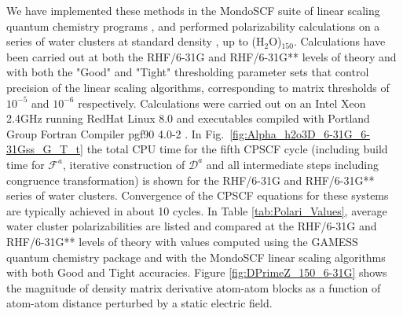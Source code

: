 \documentclass[prl,aps,twocolumn,showpacs,twocolumngrid,superbib]{revtex4}
\begin{document}
We have implemented these methods in the MondoSCF suite of linear scaling quantum chemistry programs \cite{},
and performed polarizability calculations on a series of water clusters at standard density \cite{Water}, 
up to (H$_2$O)$_{150}$. Calculations have been carried out at both the RHF/6-31G and RHF/6-31G** levels of 
theory and with both the "Good" and "Tight" thresholding parameter sets that control precision of the 
linear scaling algorithms, corresponding to matrix thresholds of $10^{-5}$ and $10^{-6}$ respectively.  
Calculations were carried out on an Intel Xeon 2.4GHz running RedHat Linux 8.0 and  executables compiled 
with Portland Group Fortran Compiler pgf90 4.0-2 \cite{PGF90}. In Fig.~\ref{fig:Alpha_h2o3D_6-31G_6-31Gss_G_T_t} the 
total CPU time for the fifth CPSCF cycle (including build time for $\mathcal{F}^a$, 
iterative construction of $\mathcal{D}^a$ and all intermediate 
steps including congruence transformation) is shown for the RHF/6-31G and RHF/6-31G** series 
of water clusters.  Convergence of the CPSCF equations for these systems are typically 
achieved in about 10 cycles.  
In Table \ref{tab:Polari_Values},  average water cluster  polarizabilities are listed and compared at the RHF/6-31G 
and RHF/6-31G** levels of theory with values computed using the GAMESS quantum chemistry package \cite{gamess} and 
with the MondoSCF linear scaling algorithms with both Good and Tight accuracies.  Figure \ref{fig:DPrimeZ_150_6-31G} 
shows the magnitude of density matrix derivative atom-atom blocks as a function of atom-atom distance perturbed 
by a static electric field.
\end{document}
